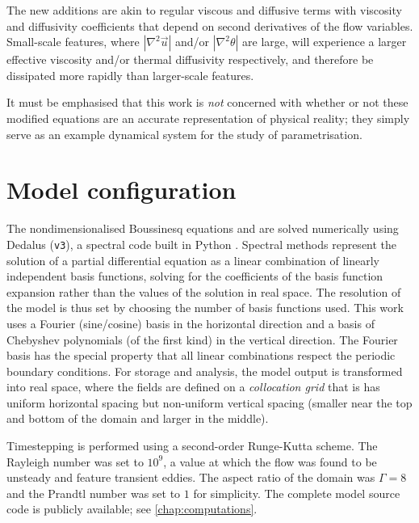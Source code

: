 \documentclass[../main.tex]{subfiles}
\begin{document}
The new additions are akin to regular viscous and diffusive terms with
viscosity and diffusivity coefficients that depend on second derivatives of the
flow variables. Small-scale features, where $|\nabla^2 \vec{u}|$ and/or
$|\nabla^2 \theta|$ are large, will experience a larger effective viscosity
and/or thermal diffusivity respectively, and therefore be dissipated more
rapidly than larger-scale features.

It must be emphasised that this work is \emph{not} concerned with whether or
not these modified equations are an accurate representation of physical
reality; they simply serve as an example dynamical system for the study of
parametrisation.


\section{Model configuration}
\label{sec:config}
The nondimensionalised Boussinesq equations
 and
 are solved numerically using Dedalus
(\texttt{v3}), a spectral code built in Python \parencite{burns2020}. Spectral
methods represent the solution of a partial differential equation as a linear
combination of linearly independent basis functions, solving for the
coefficients of the basis function expansion rather than the values of the
solution in real space. The resolution of the model is thus set by choosing the
number of basis functions used. This work uses a Fourier (sine/cosine) basis in
the horizontal direction and a basis of Chebyshev polynomials (of the first
kind) in the vertical direction. The Fourier basis has the special property
that all linear combinations respect the periodic boundary conditions.
For storage and analysis, the model output is transformed into real space,
where the fields are defined on a \emph{collocation grid} that is has uniform
horizontal spacing but non-uniform vertical spacing (smaller near the top and
bottom of the domain and larger in the middle).

Timestepping is performed using a second-order Runge-Kutta scheme. The Rayleigh
number was set to $10^9$, a value at which the flow was found to be unsteady
and feature transient eddies. The aspect ratio of the domain was $\Gamma = 8$
and the Prandtl number was set to $1$ for simplicity. The complete model source
code is publicly available; see \cref{chap:computations}.
\end{document}
